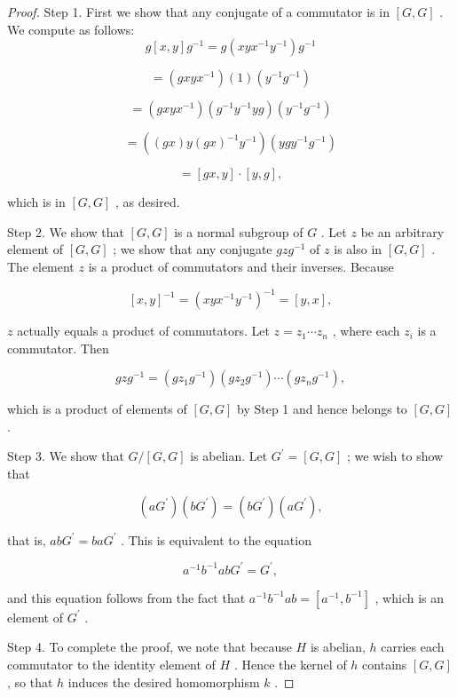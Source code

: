 \begin{proof}Step 1. First we show that any conjugate of a commutator is in \(\left\lbrack  {G,G}\right\rbrack\) . We compute as follows:
\[
g\left\lbrack  {x,y}\right\rbrack  {g}^{-1} = g\left( {{xy}{x}^{-1}{y}^{-1}}\right) {g}^{-1}
\]

\[
= \left( {{gxy}{x}^{-1}}\right) \left( 1\right) \left( {{y}^{-1}{g}^{-1}}\right)
\]

\[
= \left( {{gxy}{x}^{-1}}\right) \left( {{g}^{-1}{y}^{-1}{yg}}\right) \left( {{y}^{-1}{g}^{-1}}\right)
\]

\[
= \left( {\left( {gx}\right) y{\left( gx\right) }^{-1}{y}^{-1}}\right) \left( {{yg}{y}^{-1}{g}^{-1}}\right)
\]

\[
= \left\lbrack  {{gx},y}\right\rbrack \cdot  \left\lbrack  {y,g}\right\rbrack  ,
\]

which is in \(\left\lbrack  {G,G}\right\rbrack\) , as desired.

Step 2. We show that \(\left\lbrack  {G,G}\right\rbrack\) is a normal subgroup of \(G\) . Let \(z\) be an arbitrary element of \(\left\lbrack  {G,G}\right\rbrack\) ; we show that any conjugate \({gz}{g}^{-1}\) of \(z\) is also in \(\left\lbrack  {G,G}\right\rbrack\) . The element \(z\) is a product of commutators and their inverses. Because

\[
{\left\lbrack  x,y\right\rbrack  }^{-1} = {\left( xy{x}^{-1}{y}^{-1}\right) }^{-1} = \left\lbrack  {y,x}\right\rbrack  ,
\]

\(z\) actually equals a product of commutators. Let \(z = {z}_{1}\cdots {z}_{n}\) , where each \({z}_{i}\) is a commutator. Then

\[
{gz}{g}^{-1} = \left( {g{z}_{1}{g}^{-1}}\right) \left( {g{z}_{2}{g}^{-1}}\right) \cdots \left( {g{z}_{n}{g}^{-1}}\right) ,
\]

which is a product of elements of \(\left\lbrack  {G,G}\right\rbrack\) by Step 1 and hence belongs to \(\left\lbrack  {G,G}\right\rbrack\) .

Step 3. We show that \(G/\left\lbrack  {G,G}\right\rbrack\) is abelian. Let \({G}^{\prime } = \left\lbrack  {G,G}\right\rbrack\) ; we wish to show that

\[
\left( {a{G}^{\prime }}\right) \left( {b{G}^{\prime }}\right)  = \left( {b{G}^{\prime }}\right) \left( {a{G}^{\prime }}\right) ,
\]

that is, \({ab}{G}^{\prime } = {ba}{G}^{\prime }\) . This is equivalent to the equation

\[
{a}^{-1}{b}^{-1}{ab}{G}^{\prime } = {G}^{\prime },
\]

and this equation follows from the fact that \({a}^{-1}{b}^{-1}{ab} = \left\lbrack  {{a}^{-1},{b}^{-1}}\right\rbrack\) , which is an element of \({G}^{\prime }\) .

Step 4. To complete the proof, we note that because \(H\) is abelian, \(h\) carries each commutator to the identity element of \(H\) . Hence the kernel of \(h\) contains \(\left\lbrack  {G,G}\right\rbrack\) , so that \(h\) induces the desired homomorphism \(k\) .
\end{proof}
